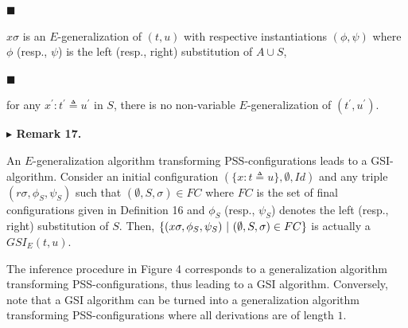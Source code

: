 \documentclass[10pt,a4paper]{amsart}
\begin{document}
\par\noindent  $\blacksquare$ 
 
$x\sigma$ is an $E$-generalization of $(t,u)$ with respective instantiations $(\phi,\psi)$ where $\phi$ (resp., $\psi$) is the left (resp., right) substitution of $A\cup S$,\par
 
 
 
\par\noindent  $\blacksquare$ 
 
for any $x^{\prime}:t^{\prime}\triangleq u^{\prime}$ in $S$, there is no non-variable $E$-generalization of $(t^{\prime},u^{\prime})$.\par
 
 
  
 
 
 
\par\medskip\noindent\textbf{$\blacktriangleright$ Remark 17.}\par
 
 
An $E$-generalization algorithm transforming PSS-configurations leads to a GSI-algorithm. Consider an initial configuration $(\{x:t\triangleq u\},\emptyset,\mathit{Id})$ and any triple $(r\sigma,\phi_{S},\psi_{S})$ such that $(\emptyset,S,\sigma)\in FC$ where $FC$ is the set of final configurations given in Definition 16 and $\phi_{S}$ (resp., $\psi_{S}$) denotes the left (resp., right) substitution of $S$. Then, $\{(x\sigma,\phi_{S},\psi_{S})\leavevmode\nobreak\ |\leavevmode\nobreak\ (\emptyset,S,\sigma)\in FC\}$ is actually a $GSI_{E}(t,u)$.\par
 
 
 
The inference procedure in Figure 4 corresponds to a generalization algorithm transforming PSS-configurations, thus leading to a GSI algorithm. Conversely, note that a GSI algorithm can be turned into a generalization algorithm transforming PSS-configurations where all derivations are of length $1$.\par
 
 
 
 
\end{document}
